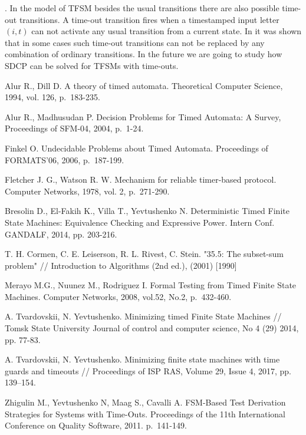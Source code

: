 \documentclass[conference]{IEEEtran}
\begin{document}
. In the model of TFSM besides the usual transitions there are also possible time-out transitions. A time-out transition fires when a timestamped input letter $(i,t)$ can not activate any usual transition from a current state. In \cite{timed_fsm} it was shown that in some cases such time-out transitions can not be replaced by any combination of ordinary transitions. In the future we are going to study how SDCP can be solved for TFSMs with time-outs.

\begin{thebibliography}{99}
	 Alur R., Dill D. A theory of timed automata. Theoretical Computer Science, 1994, vol. 126, p.~183-235.

	 Alur R., Madhusudan P. Decision Problems for Timed Automata: A Survey, Proceedings of SFM-04, 2004, p.~1-24. 

	 Finkel O. Undecidable Problems about Timed Automata. Proceedings of FORMATS’06, 2006, p.~187-199.

	 Fletcher J. G., Watson R. W. Mechanism for reliable timer-based protocol. Computer Networks, 1978, vol. 2, p.~271-290.

	 Bresolin D., El-Fakih K., Villa T., Yevtushenko N. Deterministic Timed Finite State Machines: Equivalence Checking and Expressive Power. Intern Conf. GANDALF, 2014, pp. 203-216.

	 T. H. Cormen, C. E. Leiserson, R. L. Rivest, C. Stein. "35.5: The subset-sum problem" // Introduction to Algorithms (2nd ed.), (2001) [1990]
	
	 Merayo M.G., Nuunez M., Rodriguez I. Formal Testing from Timed Finite State Machines. Computer Networks, 2008, vol.52, No.2, p.~432-460.

	 A. Tvardovskii, N. Yevtushenko. Minimizing timed Finite State Machines // Tomsk State University Journal of control and computer science, No 4 (29) 2014, pp. 77-83.

	 A. Tvardovskii, N. Yevtushenko. Minimizing finite state machines with time guards and timeouts // Proceedings of ISP RAS, Volume 29, Issue 4, 2017, pp. 139–154.

	 Zhigulin M., Yevtushenko N, Maag S., Cavalli A. FSM-Based Test Derivation Strategies for Systems with Time-Outs. Proceedings of the 11th International Conference on Quality Software, 2011. p.~141-149.

\end{thebibliography}
\end{document}
